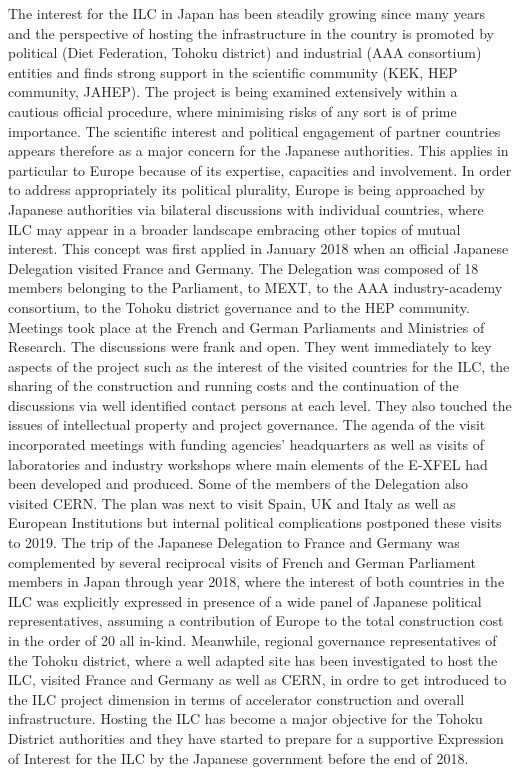 \documentclass[%
 reprint,
 amsmath,amssymb,
 aps,
]{revtex4-1}
\begin{document}
The interest for the ILC in Japan has been steadily growing since many years and the perspective
of hosting the infrastructure in the country is promoted by political (Diet Federation, Tohoku district)
and industrial (AAA consortium) entities and finds strong support in the scientific community (KEK,
HEP community, JAHEP). The project is being examined extensively within a cautious official procedure, where minimising risks of any sort is of prime importance. The scientific interest and political
engagement of partner countries appears therefore as a major concern for the Japanese authorities. This
applies in particular to Europe because of its expertise, capacities and involvement.
In order to address appropriately its political plurality, Europe is being approached by Japanese
authorities via bilateral discussions with individual countries, where ILC may appear in a broader
landscape embracing other topics of mutual interest. This concept was first applied in January 2018
when an official Japanese Delegation visited France and Germany. The Delegation was composed of
18 members belonging to the Parliament, to MEXT, to the AAA industry-academy consortium, to the
Tohoku district governance and to the HEP community. Meetings took place at the French and German
Parliaments and Ministries of Research. The discussions were frank and open. They went immediately
to key aspects of the project such as the interest of the visited countries for the ILC, the sharing of the
construction and running costs and the continuation of the discussions via well identified contact persons
at each level. They also touched the issues of intellectual property and project governance. The agenda
of the visit incorporated meetings with funding agencies' headquarters as well as visits of laboratories
and industry workshops where main elements of the E-XFEL had been developed and produced. Some
of the members of the Delegation also visited CERN. The plan was next to visit Spain, UK and Italy
as well as European Institutions but internal political complications postponed these visits to 2019.
The trip of the Japanese Delegation to France and Germany was complemented by several reciprocal
visits of French and German Parliament members in Japan through year 2018, where the interest of
both countries in the ILC was explicitly expressed in presence of a wide panel of Japanese political
representatives, assuming a contribution of Europe to the total construction cost in the order of 20 %
all in-kind. Meanwhile, regional governance representatives of the Tohoku district, where a well adapted
site has been investigated to host the ILC, visited France and Germany as well as CERN, in ordre to get
introduced to the ILC project dimension in terms of accelerator construction and overall infrastructure.
Hosting the ILC has become a major objective for the Tohoku District authorities and they have started
to prepare for a supportive Expression of Interest for the ILC by the Japanese government before the
end of 2018.
\end{document}
